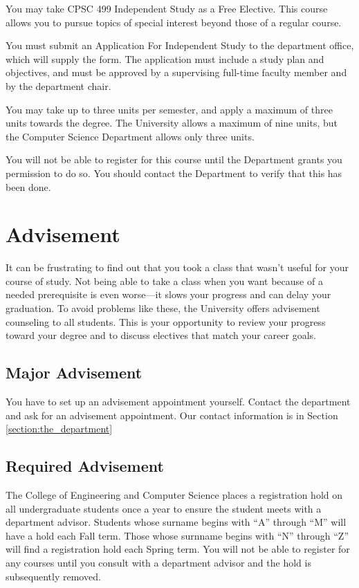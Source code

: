 \documentclass{book}
\begin{document}
You may take CPSC 499 Independent Study as a Free Elective. This course allows you to pursue topics of special interest beyond those of a regular course.

You must submit an Application For Independent Study to the department office, which will supply the form. The application must include a study plan and objectives, and must be approved by a supervising full-time faculty member and by the department chair.

You may take up to three units per semester, and apply a maximum of three units towards the degree. The University allows a maximum of nine units, but the Computer Science Department allows only three units.

You will not be able to register for this course until the Department grants you permission to do so. You should contact the Department to verify that this has been done.

\chapter{Advisement}

It can be frustrating to find out that you took a class that wasn't useful for your course of study. Not being able to take a class when you want because of a needed prerequisite is even worse---it slows your progress and can delay your graduation. To avoid problems like these, the University offers advisement counseling to all students. This is your opportunity to review your progress toward your degree and to discuss electives that match your career goals.

\section{Major Advisement}
You have to set up an advisement appointment yourself. Contact the department and ask for an advisement appointment. Our contact information is in Section \ref{section:the_department}

\section{Required Advisement}
The College of Engineering and Computer Science places a registration hold on all undergraduate students once a year to ensure the student meets with a department advisor. Students whose surname begins with ``A'' through ``M'' will have a hold each Fall term. Those whose surnname begins with ``N'' through ``Z'' will find a registration hold each Spring term.  You will not be able to register for any courses until you consult with a department advisor and the hold is subsequently removed.
\end{document}
